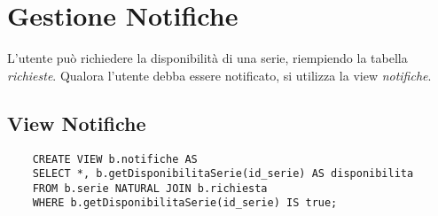 \section{Gestione Notifiche}
L'utente può richiedere la disponibilità di una serie, riempiendo la tabella \textit{richieste}. Qualora 
l'utente debba essere notificato, si utilizza la view \textit{notifiche}.

\subsection{View Notifiche}
\begin{lstlisting}
    CREATE VIEW b.notifiche AS
    SELECT *, b.getDisponibilitaSerie(id_serie) AS disponibilita
    FROM b.serie NATURAL JOIN b.richiesta
    WHERE b.getDisponibilitaSerie(id_serie) IS true;
\end{lstlisting}